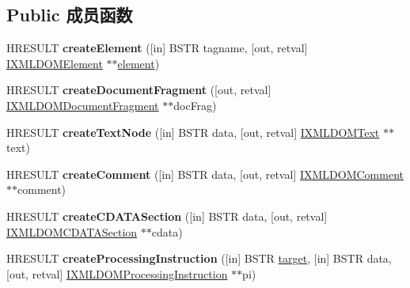 \subsection*{Public 成员函数}
\begin{DoxyCompactItemize}
\item 
\mbox{\label{interface_i_x_m_l_d_o_m_document_a0a3c732a39ae5db3b8c3a07b273603eb}} 
H\+R\+E\+S\+U\+LT {\bfseries create\+Element} (\mbox{[}in\mbox{]} B\+S\+TR tagname, \mbox{[}out, retval\mbox{]} \hyperlink{interface_i_x_m_l_d_o_m_element}{I\+X\+M\+L\+D\+O\+M\+Element} $\ast$$\ast$\hyperlink{structelement}{element})
\item 
\mbox{\label{interface_i_x_m_l_d_o_m_document_a32917310bf8143ec29c05a464bdefbbb}} 
H\+R\+E\+S\+U\+LT {\bfseries create\+Document\+Fragment} (\mbox{[}out, retval\mbox{]} \hyperlink{interface_i_x_m_l_d_o_m_document_fragment}{I\+X\+M\+L\+D\+O\+M\+Document\+Fragment} $\ast$$\ast$doc\+Frag)
\item 
\mbox{\label{interface_i_x_m_l_d_o_m_document_ad7024b0614d74da3e53c17d82ac99dac}} 
H\+R\+E\+S\+U\+LT {\bfseries create\+Text\+Node} (\mbox{[}in\mbox{]} B\+S\+TR data, \mbox{[}out, retval\mbox{]} \hyperlink{interface_i_x_m_l_d_o_m_text}{I\+X\+M\+L\+D\+O\+M\+Text} $\ast$$\ast$text)
\item 
\mbox{\label{interface_i_x_m_l_d_o_m_document_a547106de76b7fd9c98ce834074a10bef}} 
H\+R\+E\+S\+U\+LT {\bfseries create\+Comment} (\mbox{[}in\mbox{]} B\+S\+TR data, \mbox{[}out, retval\mbox{]} \hyperlink{interface_i_x_m_l_d_o_m_comment}{I\+X\+M\+L\+D\+O\+M\+Comment} $\ast$$\ast$comment)
\item 
\mbox{\label{interface_i_x_m_l_d_o_m_document_a58a7d2ee9810bc17bbecd0ace62c9fca}} 
H\+R\+E\+S\+U\+LT {\bfseries create\+C\+D\+A\+T\+A\+Section} (\mbox{[}in\mbox{]} B\+S\+TR data, \mbox{[}out, retval\mbox{]} \hyperlink{interface_i_x_m_l_d_o_m_c_d_a_t_a_section}{I\+X\+M\+L\+D\+O\+M\+C\+D\+A\+T\+A\+Section} $\ast$$\ast$cdata)
\item 
\mbox{\label{interface_i_x_m_l_d_o_m_document_a7d6a7e9057b207d363b7ec7fc4b3afac}} 
H\+R\+E\+S\+U\+LT {\bfseries create\+Processing\+Instruction} (\mbox{[}in\mbox{]} B\+S\+TR \hyperlink{interfacevoid}{target}, \mbox{[}in\mbox{]} B\+S\+TR data, \mbox{[}out, retval\mbox{]} \hyperlink{interface_i_x_m_l_d_o_m_processing_instruction}{I\+X\+M\+L\+D\+O\+M\+Processing\+Instruction} $\ast$$\ast$pi)

\end{DoxyCompactItemize}

